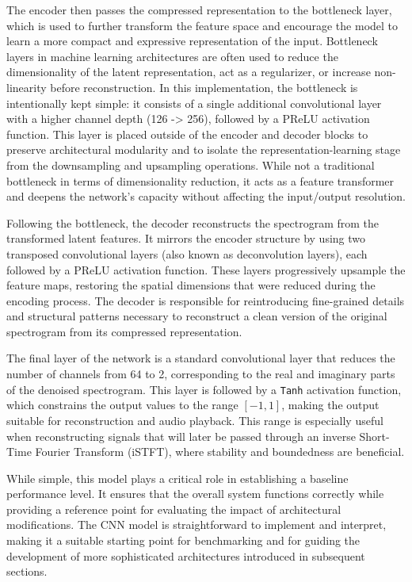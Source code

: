 The encoder then passes the compressed representation to the bottleneck layer, which is used to further transform the feature space and encourage the model to learn a more compact and expressive representation of the input. Bottleneck layers in machine learning architectures are often used to reduce the dimensionality of the latent representation, act as a regularizer, or increase non-linearity before reconstruction. In this implementation, the bottleneck is intentionally kept simple: it consists of a single additional convolutional layer with a higher channel depth (126 -> 256), followed by a PReLU activation function. This layer is placed outside of the encoder and decoder blocks to preserve architectural modularity and to isolate the representation-learning stage from the downsampling and upsampling operations. While not a traditional bottleneck in terms of dimensionality reduction, it acts as a feature transformer and deepens the network's capacity without affecting the input/output resolution.

Following the bottleneck, the decoder reconstructs the spectrogram from the transformed latent features. It mirrors the encoder structure by using two transposed convolutional layers (also known as deconvolution layers), each followed by a PReLU activation function. These layers progressively upsample the feature maps, restoring the spatial dimensions that were reduced during the encoding process. The decoder is responsible for reintroducing fine-grained details and structural patterns necessary to reconstruct a clean version of the original spectrogram from its compressed representation.

The final layer of the network is a standard convolutional layer that reduces the number of channels from 64 to 2, corresponding to the real and imaginary parts of the denoised spectrogram. This layer is followed by a \texttt{Tanh} activation function, which constrains the output values to the range \([-1, 1]\), making the output suitable for reconstruction and audio playback. This range is especially useful when reconstructing signals that will later be passed through an inverse Short-Time Fourier Transform (iSTFT), where stability and boundedness are beneficial.

While simple, this model plays a critical role in establishing a baseline performance level. It ensures that the overall system functions correctly while providing a reference point for evaluating the impact of architectural modifications. The CNN model is straightforward to implement and interpret, making it a suitable starting point for benchmarking and for guiding the development of more sophisticated architectures introduced in subsequent sections.

